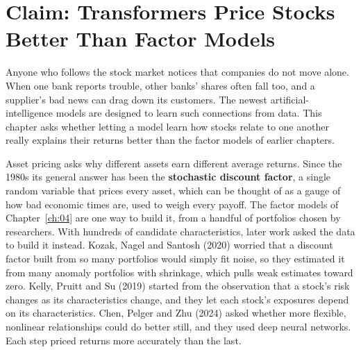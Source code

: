 \makeatletter
{}
\makeatother

\makeatletter
\makeatother

\chapter{Claim: Transformers Price Stocks Better Than Factor Models}
\label{ch:22}

Anyone who follows the stock market notices that companies do not move alone. When one bank reports trouble, other banks' shares often fall too, and a supplier's bad news can drag down its customers. The newest artificial-intelligence models are designed to learn such connections from data. This chapter asks whether letting a model learn how stocks relate to one another really explains their returns better than the factor models of earlier chapters.

Asset pricing asks why different assets earn different average returns. Since the 1980s its general answer has been the \textbf{stochastic discount factor}, a single random variable that prices every asset, which can be thought of as a gauge of how bad economic times are, used to weigh every payoff. The factor models of Chapter~\ref{ch:04} are one way to build it, from a handful of portfolios chosen by researchers. With hundreds of candidate characteristics, later work asked the data to build it instead. Kozak, Nagel and Santosh (2020) worried that a discount factor built from so many portfolios would simply fit noise, so they estimated it from many anomaly portfolios with shrinkage, which pulls weak estimates toward zero. Kelly, Pruitt and Su (2019) started from the observation that a stock's risk changes as its characteristics change, and they let each stock's exposures depend on its characteristics. Chen, Pelger and Zhu (2024) asked whether more flexible, nonlinear relationships could do better still, and they used deep neural networks. Each step priced returns more accurately than the last.

